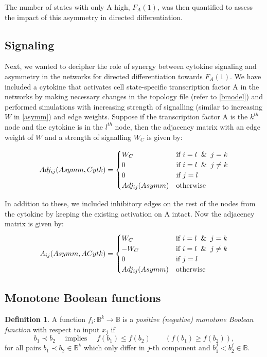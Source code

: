 \documentclass[11pt,a4paper]{article}
\newcommand{\bbB}{\mathbb{B}}
\theoremstyle{definition}
\newtheorem{defn}{Definition}
\theoremstyle{remark}
\begin{document}
The number of states with only A high, $F_A(1)$, was then quantified to assess the impact of this asymmetry in directed differentiation.

\subsection{Signaling}
Next, we wanted to decipher the role of synergy between cytokine signaling and asymmetry in the networks for directed differentiation towards $F_A(1)$. We have included a cytokine that activates cell state-specific transcription factor A in the networks by making necessary changes in the topology file (refer to \cref{bmodel}) and performed simulations with increasing strength of signalling (similar to increasing $W$ in \cref{asymm}) and edge weights. Suppose if the transcription factor A is the $k^{th}$ node and the cytokine is in the $l^{th}$ node, then the adjacency matrix with an edge weight of $W$ and a strength of signalling $W_C$ is given by:

\begin{equation}
    Adj_{ij}(Asymm, Cytk) = \begin{cases}
      W_C & \text{if $i = l \And j = k$}\\
      0 & \text{if $i = l \And j \neq k$}\\
      0 & \text{if $j = l$}\\
      Adj_{ij}(Asymm) & \text{otherwise}
    \end{cases}
\end{equation}

In addition to these, we included inhibitory edges on the rest of the nodes from the cytokine by keeping the existing activation on A intact. Now the adjacency matrix is given by:
\begin{equation}
    A_{ij}(Asymm, ACytk) = \begin{cases}
      W_C & \text{if $i = l \And j = k$}\\
      -W_C & \text{if $i = l \And j \neq k$}\\
      0 & \text{if $j = l$}\\
      Adj_{ij}(Asymm) & \text{otherwise}
    \end{cases}
\end{equation}

\subsection{Monotone Boolean functions}
\begin{defn}
A function $f_i : \bbB^k \to \bbB$ is a \textit{positive (negative) monotone Boolean function} with respect to input $x_j$ if 
\[ b_1 \prec b_2 \quad \mbox{ implies } \quad f(b_1) \leq f(b_2) \qquad (f(b_1) \geq f(b_2)),\]
for all pairs $b_1\prec b_2 \in \bbB^k$ which only differ in $j$-th component and $b_1^j< b_2^j \in \bbB$.
\end{defn}
\end{document}

